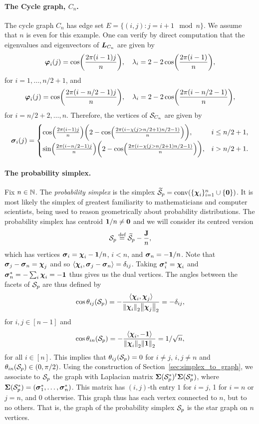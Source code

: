 \paragraph{The Cycle graph,  $C_n$.}
The cycle graph $C_n$ has edge set $E=\{(i,j):j=i+1\mod n\}$. We assume that $n$ is even for this example. 
One can  verify  by direct computation  that the eigenvalues  and eigenvectors of $\vb*{L}_{C_n}$ are given by 
\[\vb*{\varphi}_i(j) = \cos(\frac{2\pi(i-1)j}{n}),\quad \lambda_i = 2-2\cos(\frac{2\pi(i-1)}{n}),\]
for $i=1,\dots,n/2+1$, and 
\[\vb*{\varphi}_i(j) = \cos(\frac{2\pi(i-n/2-1)j}{n}),\quad \lambda_i = 2-2\cos(\frac{2\pi(i-n/2-1)}{n}),\]
for $i=n/2+2,\dots,n$. Therefore,  the vertices of $\mathcal{S}_{C_n}$ are given by  
\begin{equation*}
\vb*{\sigma}_i(j) = \begin{cases}
\cos(\frac{2\pi(i-1)j}{n})\bigg(2-\cos(\frac{2\pi(i-\chi(j>n/2+1)n/2 -1)}{n})\bigg),& i\leq n/2+1, \\
\sin(\frac{2\pi(i-n/2-1)j}{n})\bigg(2-\cos(\frac{2\pi(i-\chi(j>n/2+1)n/2 -1)}{n})\bigg),& i> n/2+1.
\end{cases}
\end{equation*}


\paragraph{The probability simplex.} 
Fix  $n\in\mathbb{N}$. The \emph{probability simplex} is the simplex $\widetilde{\mathcal{S}}_p=\textnormal{conv}(\{\boldsymbol{\chi}_i\}_{i=1}^n \cup \{\vb{0}\})$. It is most likely the simplex of greatest familiarity to mathematicians and computer scientists, being used to reason geometrically about probability distributions. The probability simplex has centroid $\vb{1}/n\neq\vb{0}$ and we will consider its centred version 
\[\mathcal{S}_p \overset{\text{def}}{=} \widetilde{\mathcal{S}}_p -  \frac{\vb{J}}{n},\]
which has vertices  $\vb*{\sigma}_i = \boldsymbol{\chi}_i - \vb{1}/n$, $i<n$, and $\vb*{\sigma}_n = -\vb{1}/n$. Note that $\vb*{\sigma}_j-\vb*{\sigma}_n = \boldsymbol{\chi}_j$ and so 
$\langle \boldsymbol{\chi}_i, \vb*{\sigma}_j-\vb*{\sigma}_n\rangle = \delta_{ij}$. Taking  $\vb*{\sigma}_i^* = \boldsymbol{\chi}_i$ and $\vb*{\sigma}_n^* = -\sum_i \boldsymbol{\chi}_i = -\vb{1}$ thus gives us the dual vertices. The  angles between the facets of $\mathcal{S}_p$ are thus defined by 
\begin{equation*}
\cos\theta_{ij}(\mathcal{S}_p) = - \frac{\langle \boldsymbol{\chi}_i,\boldsymbol{\chi}_j\rangle}{\norm{\boldsymbol{\chi}_i}_2\norm{\boldsymbol{\chi}_j}_2} = -\delta_{ij}, 
\end{equation*}
for $i,j\in[n-1]$ and 
\begin{equation*}
\cos\theta_{in}(\mathcal{S}_p) = -\frac{\langle \boldsymbol{\chi}_i,-\vb{1}\rangle}{\norm{\boldsymbol{\chi}_i}_2\norm{\vb{1}}_2} = 1/\sqrt{n},
\end{equation*}
for all $i\in[n]$. 
This implies  that $\theta_{ij}(\mathcal{S}_p) = 0$ for $i\neq j$, $i,j\neq n$ and $\theta_{in}(\mathcal{S}_p) \in (0,\pi/2)$. 
Using the  construction of Section~\ref{sec:simplex_to_graph}, we  associate to $\mathcal{S}_p$ the graph with Laplacian matrix $\boldsymbol{\Sigma}(\mathcal{S}_p^*)^t \boldsymbol{\Sigma}(\mathcal{S}_p^*)$, where $\boldsymbol{\Sigma}(\mathcal{S}_p^*)=(\vb*{\sigma}_1^*,\dots,\vb*{\sigma}_n^*)$. This matrix has $(i,j)$-th  entry $1$ for $i=j$, 1  for $i=n$ or $j=n$,  and 0 otherwise. This graph thus has each vertex connected  to $n$, but to  no others.  That  is, the graph of the probability simplex $\mathcal{S}_p$ is  the star graph on  $n$ vertices. 

